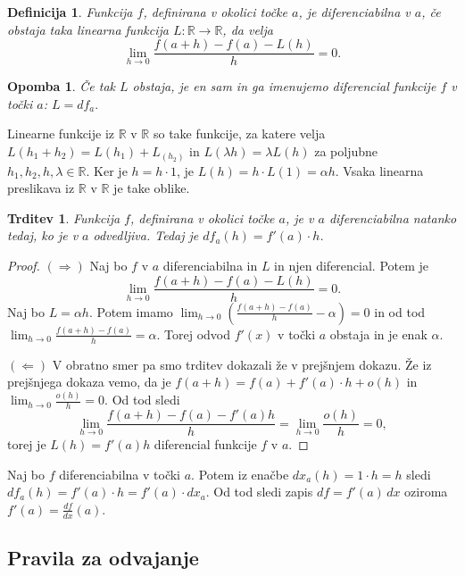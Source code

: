 \documentclass[10pt, a4paper]{article}
\newtheorem{trditev}[izr]{Trditev}
\newtheorem{defi}[izr]{Definicija}
\newenvironment{noticeB}{%
  \tcolorbox[%
  notitle,
  empty,
  enhanced,  %
  breakable,
  coltext=black,
  colback=white, 
  fontupper=\rmfamily,
  noparskip,
  sharp corners,
  boxrule=-1pt,  %
  frame hidden,
  left=7pt,  %
  right=7pt,
  top=5pt,
  bottom=5pt,
  before skip=2.5ex plus 2pt,
  after skip=2.5ex plus 2pt,
  borderline west = {1.5pt}{-0.1pt}{blue!30!black}, %
  overlay unbroken and last={%
    \draw[color=black, line width=1.25pt]
    ($(frame.south west)+(1.pt, -0.1pt)$) -- ++(2em, 0);
  }
  ]}
{\endtcolorbox}
\newenvironment{definicija}{\begin{noticeB}\begin{defi}}{%
\end{defi}\end{noticeB}}
\newtheorem*{opomba}{Opomba}
\newenvironment{noticeC}{%
  \tcolorbox[%
  notitle,
  empty,
  enhanced,  %
  breakable,
  coltext=black, 
  fontupper=\rmfamily,
  noparskip,
  sharp corners,
  boxrule=-1pt,  %
  frame hidden,
  left=7pt,  %
  right=7pt,
  top=5pt,
  bottom=5pt,
  before skip=2.5ex plus 2pt,
  after skip=2.5ex plus 2pt,
  overlay unbroken and last={%
  },
  ]}
{\endtcolorbox}
\newenvironment{dokaz}%
  {\begin{noticeC}\begin{proof}}%
  {\end{proof}\end{noticeC}}
\newcommand{\R}{\mathbb {R}}
\newcommand{\limf}[3]{\lim_{#1 \to #2} {#3}}
\begin{document}
\begin{definicija}
    Funkcija $f$, definirana v okolici točke $a$, je diferenciabilna v $a$, če obstaja
    taka linearna funkcija $L: \R \rightarrow \R$, da velja $$\limf{h}{0}{\frac{f(a+h)-f(a)-L(h)}{h}} = 0.$$
\end{definicija}

\begin{opomba}
    Če tak $L$ obstaja, je en sam in ga imenujemo diferencial funkcije $f$ v točki $a$:
    $L = df_a.$
\end{opomba}

Linearne funkcije iz $\R$ v $\R$ so take funkcije, za katere velja $L(h_1 + h_2) = L(h_1) + L_(h_2)$ in $L(\lambda h) = \lambda L(h)$
za poljubne $h_1, h_2, h, \lambda \in \R.$ Ker je $h = h \cdot 1$, je $L(h) = h \cdot L(1) = \alpha h$. 
Vsaka linearna preslikava iz $\R$ v $\R$ je take oblike.

\begin{trditev}
    Funkcija $f$, definirana v okolici točke $a$, je v $a$ diferenciabilna natanko tedaj, ko je v $a$ odvedljiva.
    Tedaj je $df_a (h) = f'(a) \cdot h$.
\end{trditev}

\begin{dokaz}
    $(\Rightarrow)$ Naj bo $f$ v $a$ diferenciabilna in $L$ in njen diferencial. Potem je 
    $$\limf{h}{0}{\frac{f(a+h) - f(a) - L(h)}{h}} = 0.$$ Naj bo $L = \alpha h$. Potem imamo
    $\limf{h}{0}{\left(\frac{f(a+h) - f(a)}{h} - \alpha \right)} = 0$ in od tod $\limf{h}{0}{\frac{f(a+h) - f(a)}{h}} = \alpha.$
    Torej odvod $f'(x)$ v točki $a$ obstaja in je enak $\alpha$.

    $(\Leftarrow)$ V obratno smer pa smo trditev dokazali že v prejšnjem dokazu. 
    Že iz prejšnjega dokaza vemo, da je
    $f(a+h) = f(a) + f'(a) \cdot h + o (h)$ in $\limf{h}{0}{\frac{o(h)}{h}} = 0.$ Od tod sledi
    $$\limf{h}{0}{\frac{f(a+h)- f(a) - f'(a)h}{h}} = \limf{h}{0}{\frac{o(h)}{h}} = 0,$$
    torej je $L(h) = f'(a) h$ diferencial funkcije $f$ v $a$.
\end{dokaz}

Naj bo $f$ diferenciabilna v točki $a$. Potem iz enačbe $dx_a(h) = 1 \cdot h = h$ sledi
$df_a (h) = f'(a) \cdot h = f'(a) \cdot dx_a.$ Od tod sledi zapis $df = f'(a)\,dx$ oziroma $f'(a) = \frac{df}{dx} (a)$.

\subsection{Pravila za odvajanje}
\end{document}
